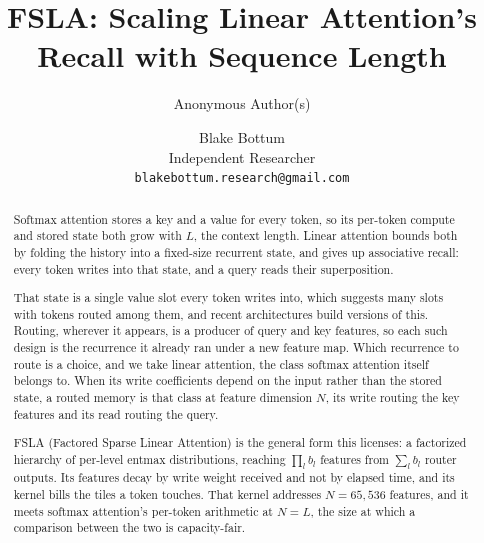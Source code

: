 \documentclass{article}
\title{FSLA: Scaling Linear Attention's Recall with Sequence Length}
\author{Anonymous Author(s)}
\author{%
    Blake Bottum\\
    Independent Researcher\\
    \texttt{blakebottum.research@gmail.com}%
  }
\date{}
\theoremstyle{definition}
\newcommand{\Nst}{N}            %
\newcommand{\bl}{b_l}           %
\begin{document}
\maketitle

\begin{abstract}
Softmax attention stores a key and a value for every token, so its per-token compute and stored state both grow with $L$, the context length. Linear attention bounds both by folding the history into a fixed-size recurrent state, and gives up associative recall: every token writes into that state, and a query reads their superposition.

That state is a single value slot every token writes into, which suggests many slots with tokens routed among them, and recent architectures build versions of this. Routing, wherever it appears, is a producer of query and key features, so each such design is the recurrence it already ran under a new feature map. Which recurrence to route is a choice, and we take linear attention, the class softmax attention itself belongs to. When its write coefficients depend on the input rather than the stored state, a routed memory is that class at feature dimension $\Nst$, its write routing the key features and its read routing the query.

FSLA (Factored Sparse Linear Attention) is the general form this licenses: a factorized hierarchy of per-level entmax distributions, reaching $\prod_l \bl$ features from $\sum_l \bl$ router outputs. Its features decay by write weight received and not by elapsed time, and its kernel bills the tiles a token touches. That kernel addresses $\Nst = 65{,}536$ features, and it meets softmax attention's per-token arithmetic at $\Nst = L$, the size at which a comparison between the two is capacity-fair. 
\end{abstract}











\end{document}
